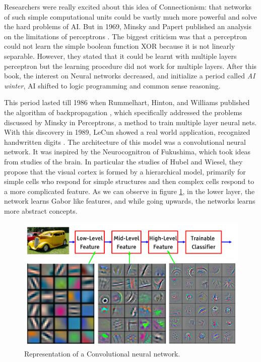 Researchers were really excited about this idea of Connectionism: that networks of such simple computational units could be vastly much more powerful and solve the hard problems of AI. But in 1969, Minsky and Papert  published an analysis on the limitations of perceptrons \cite{minsky69perceptrons}. The biggest criticism was that a perceptron could not learn the simple boolean function XOR because it is not linearly separable. However, they stated that it could be learnt with multiple layers perceptron but the learning procedure did not work for multiple layers. After this book, the interest on Neural networks decreased, and initialize a period called \textit{AI winter}, AI shifted to logic programming and common sense reasoning.

This period lasted till 1986 when Rummelhart, Hinton, and Williams published the algorithm of backpropagation \cite{Rumelhart}, which specifically addressed the problems discussed by Minsky in Perceptrons, a method to train multiple layer neural nets. With this discovery in 1989, LeCun showed a real world application, recognized handwritten digits \cite{lecunZip}. The architecture of this model was a convolutional neural network. It was inspired by the Neurocognitron \cite{Fukushima} of Fukushima, which took ideas from studies of the brain. In particular the studies of Hubel and Wiesel, they propose that the visual cortex is formed by a hierarchical model, primarily for simple cells who respond for simple structures and then complex cells respond to a more complicated feature. As we can observe in figure \ref{intro1}, in the lower layer, the network learns Gabor like features, and while going upwards, the networks learns more abstract concepts.




\begin{figure}[H]
\centering         
\includegraphics[width=12cm]{intro/model.png}
\caption{Representation of a Convolutional neural network.} \label{intro1}
\end{figure}



